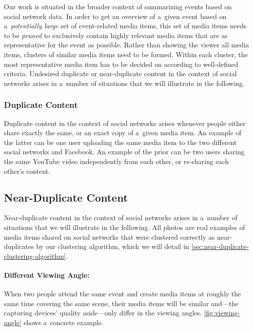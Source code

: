 Our work is situated in the broader context of summarizing events
based on social network data.
In order to get an overview of a~given event based on a~\emph{potentially large} set
of event-related media items, this set of media items needs to be \emph{pruned}
to exclusively contain highly relevant media items that are as representative
for the event as possible.
Rather than showing the viewer all media items,
clusters of similar media items need to be formed.
Within each cluster, the most representative media item
has to be decided on according to well-defined criteria.
Undesired duplicate or near-duplicate content in the context of social networks
arises in a~number of situations
that we will illustrate in the following.

\subsubsection{Duplicate Content}
\label{sec:duplicate-content}

Duplicate content in the context of social networks
arises whenever people either share exactly the same,
or an exact copy of a~given media item.
An example of the latter can be one user uploading the same media item
to the two different social networks \googleplus and Facebook.
An example of the prior can be two users sharing the same
YouTube video independently from each other, or re-sharing each other's content.

\subsection{Near-Duplicate Content}
\label{sec:near-duplicate-content}

Near-duplicate content in the context of social networks
arises in a~number of situations
that we will illustrate in the following.
All photos are real examples of media items shared on social networks
that were clustered correctly as near-duplicates
by our clustering algorithm, which we will detail in
\autoref{sec:near-duplicate-clustering-algorithm}.

\paragraph{Different Viewing Angle:}

When two people attend the same event
and create media items at roughly the same time
covering the same scene,
their media items will be similar
and---the capturing devices' quality aside---only differ in the viewing angles. 
\autoref{fig:viewing-angle} shows a~concrete example.

